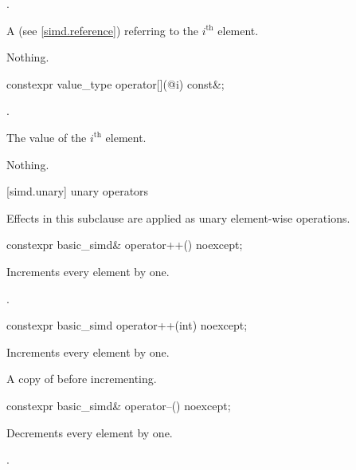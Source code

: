 \begin{itemdescr}
  \pnum\expects
  .

  \pnum\returns
  A  (see \ref{simd.reference}) referring to the $i^\text{th}$ element.

  \pnum\throws Nothing.
\end{itemdescr}

\begin{itemdecl}
constexpr value_type operator[](@\simdsizetype@ i) const&;
\end{itemdecl}

\begin{itemdescr}
  \pnum\expects
  .

  \pnum\returns
  The value of the $i^\text{th}$ element.

  \pnum\throws Nothing.
\end{itemdescr}

[simd.unary]{ unary operators}

\pnum
Effects in this subclause are applied as unary element-wise operations.

\begin{itemdecl}
constexpr basic_simd& operator++() noexcept;
\end{itemdecl}

\begin{itemdescr}
  \pnum{}

  \pnum\effects
  Increments every element by one.

  \pnum\returns
  .
\end{itemdescr}

\begin{itemdecl}
constexpr basic_simd operator++(int) noexcept;
\end{itemdecl}

\begin{itemdescr}
  \pnum{}

  \pnum\effects
  Increments every element by one.

  \pnum\returns
  A copy of  before incrementing.
\end{itemdescr}

\begin{itemdecl}
constexpr basic_simd& operator--() noexcept;
\end{itemdecl}

\begin{itemdescr}
  \pnum{}

  \pnum\effects
  Decrements every element by one.

  \pnum\returns
  .
\end{itemdescr}

